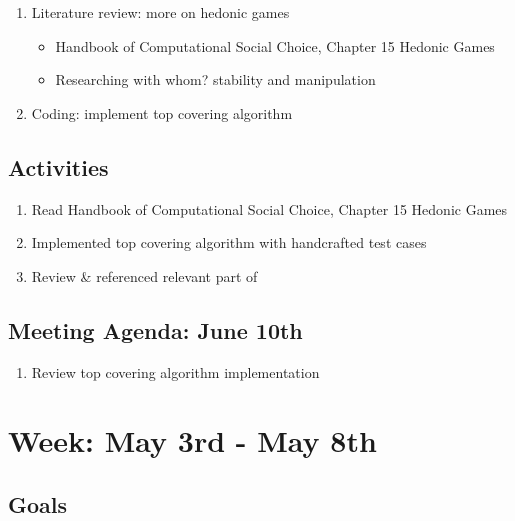 \documentclass[a4paper]{article}
\begin{document}
\begin{enumerate}
  \item Literature review: more on hedonic games
  \begin{itemize}
    \item Handbook of Computational Social Choice, Chapter 15 Hedonic Games \cite{aziz_savani_moulin_2016}
    \item Researching with whom? stability and manipulation \cite{ALCALDE2004869}
  \end{itemize}

  \item Coding: implement top covering algorithm

\end{enumerate}

\subsection*{Activities}

\begin{enumerate}
  \item Read Handbook of Computational Social Choice, Chapter 15 Hedonic Games \cite{aziz_savani_moulin_2016}
  \item Implemented top covering algorithm with handcrafted test cases
  \item Review \& referenced relevant part of \cite{ALCALDE2004869}
\end{enumerate}

\subsection*{Meeting Agenda: June 10th}

\begin{enumerate}
  \item Review top covering algorithm implementation
\end{enumerate}

\section*{Week: May 3rd - May 8th}

\subsection*{Goals}
\end{document}
